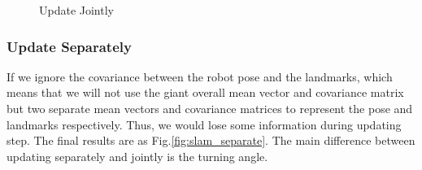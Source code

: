 \documentclass[conference]{IEEEtran}
\begin{document}
\begin{figure}[htbp]
    \centering

    \centering
    \caption{Update Jointly} \label{fig:slam_joint}
\end{figure}


\subsubsection{Update Separately}
If we ignore the covariance between the robot pose and the landmarks, which means that we will not use the giant overall 
mean vector and covariance matrix but two separate mean vectors and covariance matrices to represent the pose and landmarks
respectively. Thus, we would lose some information during updating step. The final results are as Fig.\ref{fig:slam_separate}.
The main difference between updating separately and jointly is the turning angle.
\end{document}

